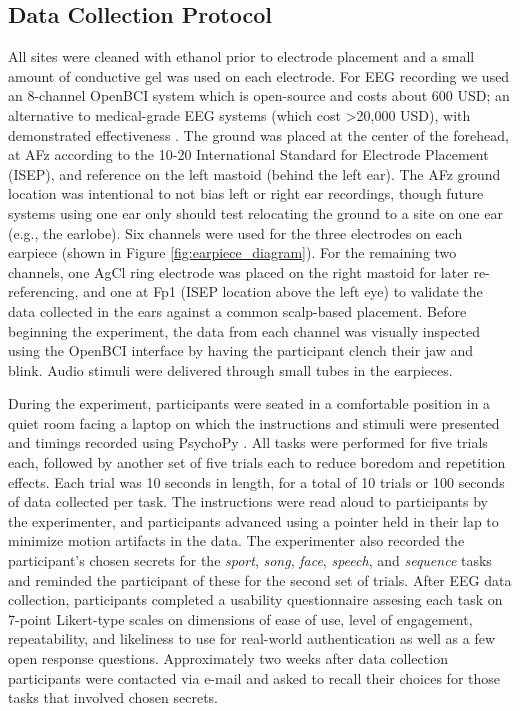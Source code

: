 \documentclass[a4paper,twoside]{article}
\begin{document}
\subsection{Data Collection Protocol}

\noindent All sites were cleaned with ethanol prior to electrode placement and a small amount of conductive gel was used on each electrode. For EEG recording we used an 8-channel OpenBCI system \cite{michalska2009openbci} which is open-source and costs about 600 USD; an alternative to medical-grade EEG systems (which cost \textgreater20,000 USD), with demonstrated effectiveness \cite{Frey2016}. The ground was placed at the center of the forehead, at AFz according to the 10-20 International Standard for Electrode Placement (ISEP), and reference on the left mastoid (behind the left ear). The AFz ground location was intentional to not bias left or right ear recordings, though future systems using one ear only should test relocating the ground to a site on one ear (e.g., the earlobe). Six channels were used for the three electrodes on each earpiece (shown in Figure \ref{fig:earpiece_diagram}). For the remaining two channels, one AgCl ring electrode was placed on the right mastoid for later re-referencing, and one at Fp1 (ISEP location above the left eye) to validate the data collected in the ears against a common scalp-based placement. Before beginning the experiment, the data from each channel was visually inspected using the OpenBCI interface by having the participant clench their jaw and blink. Audio stimuli were delivered through small tubes in the earpieces.

During the experiment, participants were seated in a comfortable position in a quiet room facing a laptop on which the instructions and stimuli were presented and timings recorded using PsychoPy \cite{peirce2007psychopy}. All tasks were performed for five trials each, followed by another set of five trials each to reduce boredom and repetition effects. Each trial was 10 seconds in length, for a total of 10 trials or 100 seconds of data collected per task. The instructions were read aloud to participants by the experimenter, and participants advanced using a pointer held in their lap to minimize motion artifacts in the data. The experimenter also recorded the participant's chosen secrets for the \textit{sport}, \textit{song}, \textit{face}, \textit{speech}, and \textit{sequence} tasks and reminded the participant of these for the second set of trials. After EEG data collection, participants completed a usability questionnaire assesing each task on 7-point Likert-type scales on dimensions of ease of use, level of engagement, repeatability, and likeliness to use for real-world authentication as well as a few open response questions. Approximately two weeks after data collection participants were contacted via e-mail and asked to recall their choices for those tasks that involved chosen secrets.
\end{document}

